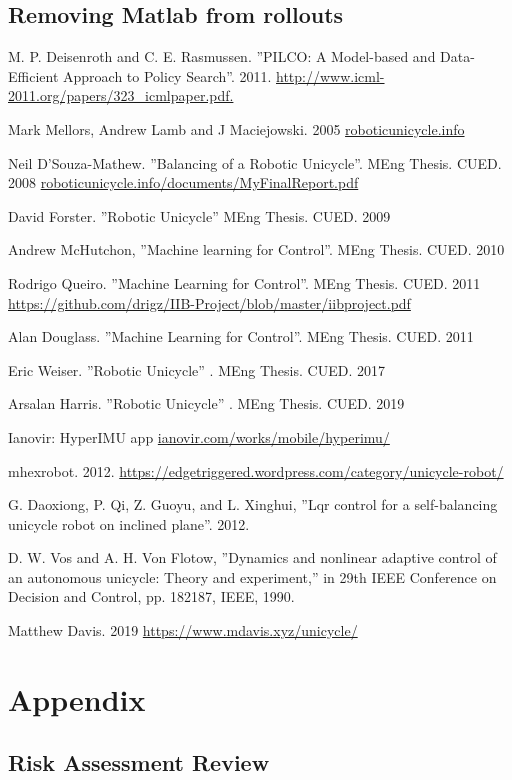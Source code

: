 \documentclass[twoside,twocolumn,12pt]{article}
\begin{document}
\subsection{Removing Matlab from rollouts}



\clearpage
\begin{thebibliography}{9}
M. P. Deisenroth and C. E. Rasmussen. ''PILCO: A Model-based and Data-Efficient Approach to Policy Search''.
2011. \url{http://www.icml-2011.org/papers/323_icmlpaper.pdf.}

Mark Mellors, Andrew Lamb and J Maciejowski. 2005 \url{roboticunicycle.info} 

Neil D'Souza-Mathew. ''Balancing of a Robotic Unicycle''. MEng Thesis. CUED. 2008 \url{roboticunicycle.info/documents/MyFinalReport.pdf}

David Forster. ''Robotic Unicycle'' MEng Thesis. CUED. 2009

Andrew McHutchon, ''Machine learning for Control''. MEng Thesis. CUED. 2010

Rodrigo Queiro. ''Machine Learning for Control''. MEng Thesis. CUED. 2011
\url{https://github.com/drigz/IIB-Project/blob/master/iibproject.pdf}

Alan Douglass. ''Machine Learning for Control''. MEng Thesis. CUED. 2011

Eric Weiser. ''Robotic Unicycle'' . MEng Thesis. CUED. 2017

Arsalan Harris. ''Robotic Unicycle'' . MEng Thesis. CUED. 2019
 
 
Ianovir: HyperIMU app 
\url{ianovir.com/works/mobile/hyperimu/}

mhexrobot. 2012. \url{https://edgetriggered.wordpress.com/category/unicycle-robot/}

G. Daoxiong, P. Qi, Z. Guoyu, and L. Xinghui, ''Lqr control for a self-balancing unicycle
robot on inclined plane''. 2012.

D. W. Vos and A. H. Von Flotow, ''Dynamics and nonlinear adaptive control of an
autonomous unicycle: Theory and experiment,'' in 29th IEEE Conference on Decision
and Control, pp. 182{187, IEEE, 1990.}

Matthew Davis. 2019 \url{https://www.mdavis.xyz/unicycle/}





\end{thebibliography}



\clearpage
\section{Appendix}
\subsection{Risk Assessment Review}





\end{document}
